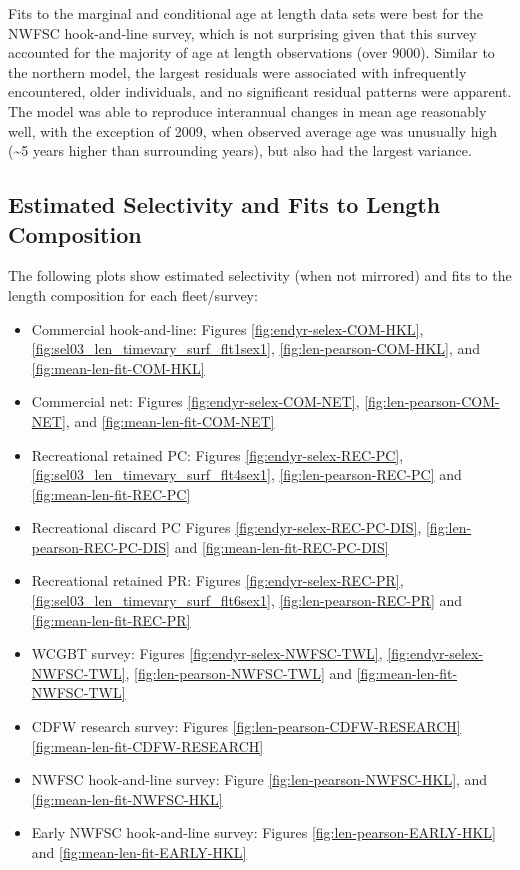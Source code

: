 \documentclass[
  english,
  a4paper,
]{article}
\providecommand{\tightlist}{%
  \setlength{\itemsep}{0pt}\setlength{\parskip}{0pt}}
\begin{document}
Fits to the marginal and conditional age at length data sets were best for the NWFSC hook-and-line survey, which is not surprising given that this survey accounted for the majority of age at length observations (over 9000). Similar to the northern model, the largest residuals were associated with infrequently encountered, older individuals, and no significant residual patterns were apparent. The model was able to reproduce interannual changes in mean age reasonably well, with the exception of 2009, when observed average age was unusually high (\textasciitilde5 years higher than surrounding years), but also had the largest variance.

\hypertarget{estimated-selectivity-and-fits-to-length-composition}{%
\subsection{Estimated Selectivity and Fits to Length Composition}\label{estimated-selectivity-and-fits-to-length-composition}}

The following plots show estimated selectivity (when not mirrored) and fits to the length composition for each
fleet/survey:

\begin{itemize}
\tightlist
\item
  Commercial hook-and-line: Figures \ref{fig:endyr-selex-COM-HKL}, \ref{fig:sel03_len_timevary_surf_flt1sex1}, \ref{fig:len-pearson-COM-HKL}, and \ref{fig:mean-len-fit-COM-HKL}\\
\item
  Commercial net: Figures \ref{fig:endyr-selex-COM-NET}, \ref{fig:len-pearson-COM-NET}, and \ref{fig:mean-len-fit-COM-NET}
\item
  Recreational retained PC: Figures \ref{fig:endyr-selex-REC-PC}, \ref{fig:sel03_len_timevary_surf_flt4sex1}, \ref{fig:len-pearson-REC-PC} and \ref{fig:mean-len-fit-REC-PC}\\
\item
  Recreational discard PC Figures \ref{fig:endyr-selex-REC-PC-DIS}, \ref{fig:len-pearson-REC-PC-DIS} and \ref{fig:mean-len-fit-REC-PC-DIS}
\item
  Recreational retained PR: Figures \ref{fig:endyr-selex-REC-PR}, \ref{fig:sel03_len_timevary_surf_flt6sex1}, \ref{fig:len-pearson-REC-PR} and \ref{fig:mean-len-fit-REC-PR}\\
\item
  WCGBT survey: Figures \ref{fig:endyr-selex-NWFSC-TWL}, \ref{fig:endyr-selex-NWFSC-TWL}, \ref{fig:len-pearson-NWFSC-TWL} and \ref{fig:mean-len-fit-NWFSC-TWL}
\item
  CDFW research survey: Figures \ref{fig:len-pearson-CDFW-RESEARCH} \ref{fig:mean-len-fit-CDFW-RESEARCH}\\
\item
  NWFSC hook-and-line survey: Figure \ref{fig:len-pearson-NWFSC-HKL}, and \ref{fig:mean-len-fit-NWFSC-HKL}
\item
  Early NWFSC hook-and-line survey: Figures \ref{fig:len-pearson-EARLY-HKL} and \ref{fig:mean-len-fit-EARLY-HKL}
\end{itemize}
\end{document}
